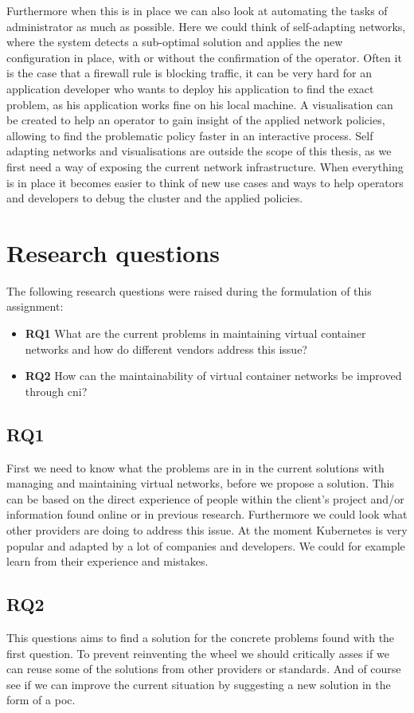 Furthermore when this is in place we can also look at automating the tasks of administrator as much as possible. Here we could think of self-adapting networks, where the system detects a sub-optimal solution and applies the new configuration in place, with or without the confirmation of the operator. Often it is the case that a firewall rule is blocking traffic, it can be very hard for an application developer who wants to deploy his application to find the exact problem, as his application works fine on his local machine. A visualisation can be created to help an operator to gain insight of the applied network policies, allowing to find the problematic policy faster in an interactive process. Self adapting networks and visualisations are outside the scope of this thesis, as we first need a way of exposing the current network infrastructure. When everything is in place it becomes easier to think of new use cases and ways to help operators and developers to debug the cluster and the applied policies.

\section{Research questions}
The following research questions were raised during the formulation of this assignment:
\begin{itemize}
    \item \textbf{RQ1} What are the current problems in maintaining virtual container networks and how do different vendors address this issue?
    \item \textbf{RQ2} How can the maintainability of virtual container networks be improved through \gls{cni}?   
\end{itemize}

\subsection{RQ1}
First we need to know what the problems are in in the current solutions with managing and maintaining virtual networks, before we propose a solution. This can be based on the direct experience of people within the client's project and/or information found online or in previous research. Furthermore we could look what other providers are doing to address this issue. At the moment Kubernetes is very popular and adapted by a lot of companies and developers. We could for example learn from their experience and mistakes.

\subsection{RQ2}
This questions aims to find a solution for the concrete problems found with the first question. To prevent reinventing the wheel we should critically asses if we can reuse some of the solutions from other providers or standards. And of course see if we can improve the current situation by suggesting a new solution in the form of a \gls{poc}.
